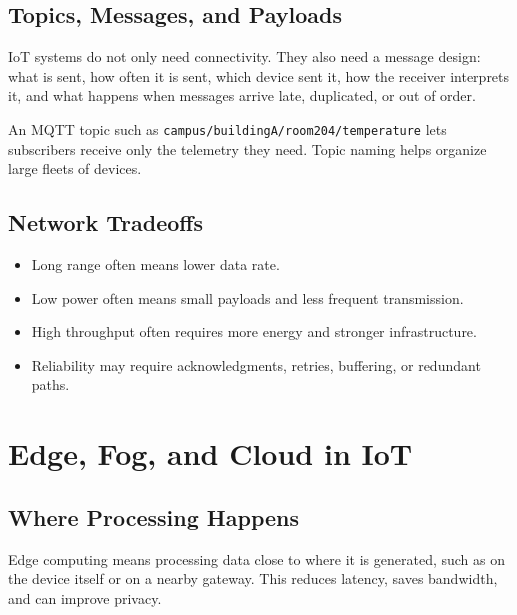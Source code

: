\documentclass[11pt,a4paper]{article}
\begin{document}
\subsection{Topics, Messages, and Payloads}

\begin{conceptbox}
IoT systems do not only need connectivity. They also need a message design: what is sent, how often it is sent, which device sent it, how the receiver interprets it, and what happens when messages arrive late, duplicated, or out of order.
\end{conceptbox}

\begin{examplebox}
An MQTT topic such as \texttt{campus/buildingA/room204/temperature} lets subscribers receive only the telemetry they need. Topic naming helps organize large fleets of devices.
\end{examplebox}

\subsection{Network Tradeoffs}

\begin{itemize}[leftmargin=*]
  \item Long range often means lower data rate.
  \item Low power often means small payloads and less frequent transmission.
  \item High throughput often requires more energy and stronger infrastructure.
  \item Reliability may require acknowledgments, retries, buffering, or redundant paths.
\end{itemize}

\section{Edge, Fog, and Cloud in IoT}

\subsection{Where Processing Happens}

\begin{definitionbox}
Edge computing means processing data close to where it is generated, such as on the device itself or on a nearby gateway. This reduces latency, saves bandwidth, and can improve privacy.
\end{definitionbox}
\end{document}
